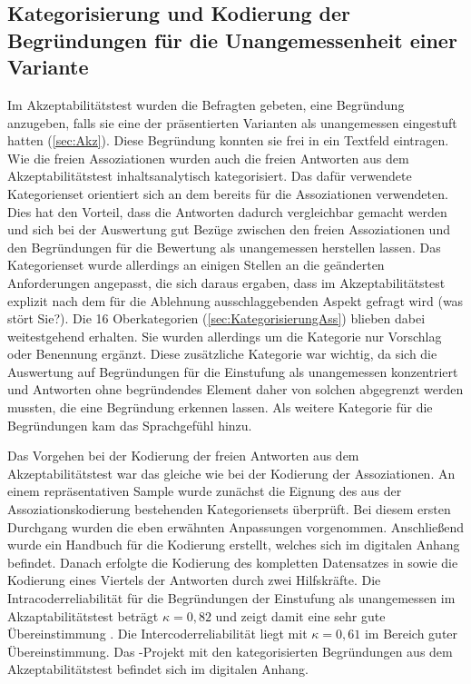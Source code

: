 \subsection{Kategorisierung und Kodierung der Begründungen für die Unangemessenheit einer Variante}
\label{sec:KategorisierungAkz}
Im Akzeptabilitätstest wurden die Befragten gebeten, eine Begründung anzugeben, falls sie eine der präsentierten Varianten als unangemessen eingestuft hatten (\autoref{sec:Akz}). 
Diese Begründung konnten sie frei in ein Textfeld eintragen. 
Wie die freien Assoziationen wurden auch die freien Antworten aus dem Akzeptabilitätstest inhaltsanalytisch kategorisiert. 
Das dafür verwendete Kategorienset orientiert sich an dem bereits für die Assoziationen verwendeten.
Dies hat den Vorteil, dass die Antworten dadurch vergleichbar gemacht werden und sich bei der Auswertung gut Bezüge zwischen den freien Assoziationen und den Begründungen für die Bewertung als unangemessen herstellen lassen. 
Das Kategorienset wurde allerdings an einigen Stellen an die geänderten Anforderungen angepasst, die sich daraus ergaben, dass im Akzeptabilitätstest explizit nach dem für die Ablehnung ausschlaggebenden Aspekt gefragt wird (\glqq was stört Sie?\grqq). 
Die 16 Oberkategorien (\autoref{sec:KategorisierungAss}) blieben dabei weitestgehend erhalten. 
Sie wurden allerdings um die Kategorie \glqq nur Vorschlag oder Benennung\grqq{} ergänzt. 
Diese zusätzliche Kategorie war wichtig, da sich die Auswertung auf Begründungen für die Einstufung als unangemessen konzentriert und Antworten ohne begründendes Element daher von solchen abgegrenzt werden mussten, die eine Begründung erkennen lassen. 
Als weitere Kategorie für die Begründungen kam das \glqq Sprachgefühl\grqq{} hinzu. 

Das Vorgehen bei der Kodierung der freien Antworten aus dem Akzeptabilitätstest war das gleiche wie bei der Kodierung der Assoziationen. 
An einem repräsentativen Sample wurde zunächst die Eignung des aus der Assoziationskodierung bestehenden Kategoriensets überprüft. 
Bei diesem ersten Durchgang wurden die eben erwähnten Anpassungen vorgenommen. 
Anschließend wurde ein Handbuch für die Kodierung erstellt, welches sich im digitalen Anhang befindet. 
Danach erfolgte die Kodierung des kompletten Datensatzes in \citeauthor{MAXQDA.19892018} sowie die Kodierung eines Viertels der Antworten durch zwei Hilfskräfte. 
Die Intracoderreliabilität für die Begründungen der Einstufung als unangemessen im Akzaptabilitätstest beträgt $\kappa=0{,}82$ und zeigt damit eine sehr gute Übereinstimmung \citep[s.][346]{Doring2016}. 
Die Intercoderreliabilität liegt mit $\kappa=0{,}61$ im Bereich guter Übereinstimmung. 
Das \citeauthor{MAXQDA.19892018}-Projekt mit den kategorisierten Begründungen aus dem Akzeptabilitätstest befindet sich im digitalen Anhang. 
